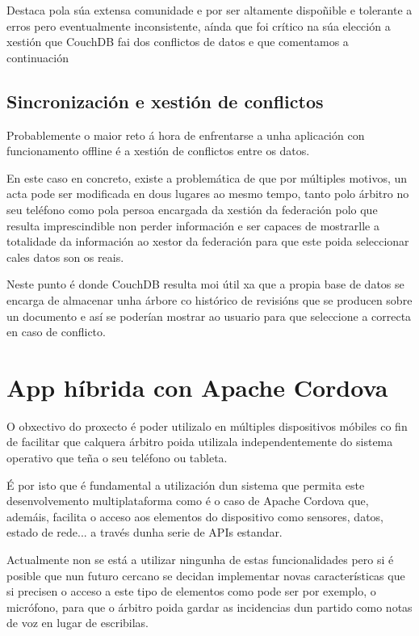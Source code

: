     Destaca pola súa extensa comunidade e por ser altamente dispoñible e 
tolerante a erros pero eventualmente inconsistente, aínda que foi crítico na 
súa elección a xestión que CouchDB fai dos conflictos de datos e que comentamos 
a continuación

    \subsection{Sincronización e xestión de conflictos}
    Probablemente o maior reto á hora de enfrentarse a unha aplicación con 
funcionamento offline é a xestión de conflictos entre os datos.

    En este caso en concreto, existe a problemática de que por múltiples 
motivos, un acta pode ser modificada en dous lugares ao mesmo tempo, tanto polo 
árbitro no seu teléfono como pola persoa encargada da xestión da federación
polo que resulta imprescindible non perder información e ser capaces de 
mostrarlle a totalidade da información ao xestor da federación para que este 
poida seleccionar cales datos son os reais.

    Neste punto é donde CouchDB resulta moi útil xa que a propia base de datos 
se encarga de almacenar unha árbore co histórico de revisións que se producen 
sobre un documento e así se poderían mostrar ao usuario para que seleccione a 
correcta en caso de conflicto.

  \section{App híbrida con Apache Cordova}
  O obxectivo do proxecto é poder utilizalo en múltiples dispositivos móbiles 
co fin de facilitar que calquera árbitro poida utilizala independentemente do 
sistema operativo que teña o seu teléfono ou tableta.

  É por isto que é fundamental a utilización dun sistema que permita este 
desenvolvemento multiplataforma como é o caso de Apache 
Cordova\cite{web:apachecordova} que, ademáis, 
facilita o acceso aos elementos do dispositivo como sensores, datos, estado de 
rede... a través dunha serie de APIs estandar.

  Actualmente non se está a utilizar ningunha de estas funcionalidades pero si 
é posible que nun futuro cercano se decidan implementar novas características 
que si precisen o acceso a este tipo de elementos como pode ser por exemplo, o 
micrófono, para que o árbitro poida gardar as incidencias dun partido como 
notas de voz en lugar de escribilas.

